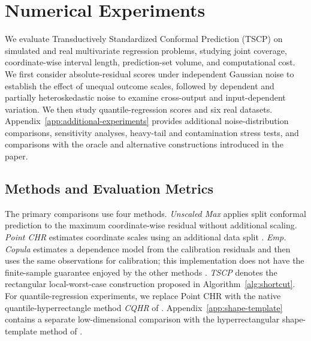 
\begingroup
\color{blue}
\setlength{\emergencystretch}{2em}

\FloatBarrier
\section{Numerical Experiments}
\label{sec:numerical-experiments}
\label{sec:experiments}

We evaluate Transductively Standardized Conformal Prediction (TSCP) on
simulated and real multivariate regression problems, studying joint coverage,
coordinate-wise interval length, prediction-set volume, and computational cost. 
We first consider absolute-residual scores under independent Gaussian noise
to establish the effect of unequal outcome scales, followed by dependent
and partially heteroskedastic noise to examine cross-output and
input-dependent variation. We then study quantile-regression scores and
six real datasets. Appendix~\ref{app:additional-experiments} provides
additional noise-distribution comparisons, sensitivity analyses, heavy-tail
and contamination stress tests, and comparisons with the oracle and
alternative constructions introduced in the paper.

\subsection{Methods and Evaluation Metrics}
\label{sec:experiment-methods}

The primary comparisons use four methods. \emph{Unscaled Max} applies split
conformal prediction to the maximum coordinate-wise residual without
additional scaling. \emph{Point CHR} estimates coordinate scales using an
additional data split \citep{sampson2024conformal}. \emph{Emp.
Copula} estimates a dependence model from the calibration residuals and then
uses the same observations for calibration; this implementation does not have
the finite-sample guarantee enjoyed by the other methods
\citep{messoudi2021copula}. \emph{TSCP} denotes
the rectangular local-worst-case construction proposed in Algorithm~\ref{alg:shortcut}. For
quantile-regression experiments, we replace Point CHR with the native
quantile-hyperrectangle method \emph{CQHR} of
\citet{sampson2024conformal}. Appendix~\ref{app:shape-template} contains a
separate low-dimensional comparison with the hyperrectangular shape-template
method of \citet{tumu2024templates}.


